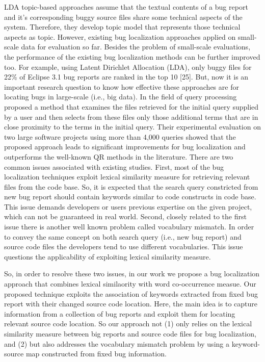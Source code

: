 \documentclass[conference]{IEEEtran}
\begin{document}
LDA topic-based approaches \cite{Anh} \cite{Lukins} assume that the textual contents of a bug report and it's corresponding buggy source files share some technical aspects of the system.
Therefore, they develop topic model that represents those technical aspects as topic. 
However, existing bug localization approaches applied on small-scale data for evaluation so far.
Besides the problem of small-scale evaluations, the performance of the existing bug localization methods can be further improved too. For example, using Latent Dirichlet Allocation (LDA), only buggy files for 22\% of Eclipse 3.1 bug reports are ranked in the top 10 [25]. 
But, now it is an important research question to know how effective these approaches are for locating bugs in large-scale (i.e., big data).
In the field of query processing
\citet{Sisman}  proposed a method that examines the files retrieved for the initial query supplied by a user and then selects from these files only those additional terms that are in close proximity to the terms in the initial query. Their \cite{Sisman} experimental evaluation on two large software projects using more than 4,000 queries showed that the proposed approach leads to significant improvements for bug localization and outperforms the well-known QR methods
in the literature.
There are two common issues associated with existing studies. First, 
most of the bug localization techniques exploit lexical similarity measure for retrieving relevant files from the code base. So, it is expected that the search query constricted from new bug report should contain keywords similar to code constructs in code base. This issue demands developers or users  previous expertise on the given project, which can not be guaranteed in real world. 
Second, closely related to the first issue there is another well known problem called vocabulary mismatch. In order to convey the same concept on both search query (i.e., new bug report) and source code files the developers tend to use different vocabularies. This issue questions the applicability of exploiting lexical similarity measure.

So, in order to resolve these two issues, in our work we propose a bug localization approach that combines lexical similaority with word co-occurrence measue. 
Our proposed technique exploits the association of keywords extracted from fixed bug report with their changed source code location. Here, the main idea is to capture information from a collection of bug reports and exploit them for locating relevant source code location.
So our approach not (1) only relies on the lexical similarity measure between big reports and source code files for bug localization, and (2) but also addresses the vocabulary mismatch problem by using a keyword-source map constructed from fixed bug information.
\end{document}

